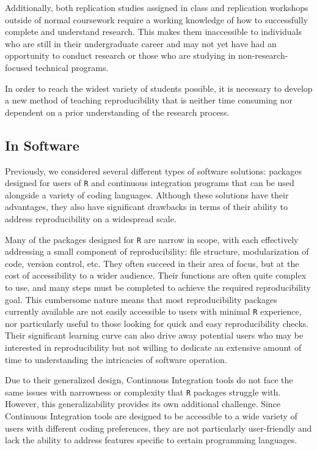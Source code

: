 \documentclass[12pt,twoside]{reedthesis}
\begin{document}
Additionally, both replication studies assigned in class and replication workshops outside of normal coursework require a working knowledge of how to successfully complete and understand research. This makes them inaccessible to individuals who are still in their undergraduate career and may not yet have had an opportunity to conduct research or those who are studying in non-research-focused technical programs.

In order to reach the widest variety of students possible, it is necessary to develop a new method of teaching reproducibility that is neither time consuming nor dependent on a prior understanding of the research process.

\hypertarget{in-software}{%
\subsection{In Software}\label{in-software}}

Previously, we considered several different types of software solutions: packages designed for users of \texttt{R} and continuous integration programs that can be used alongside a variety of coding languages. Although these solutions have their advantages, they also have significant drawbacks in terms of their ability to address reproducibility on a widespread scale.

Many of the packages designed for \texttt{R} are narrow in scope, with each effectively addressing a small component of reproducibility: file structure, modularization of code, version control, etc. They often succeed in their area of focus, but at the cost of accessibility to a wider audience. Their functions are often quite complex to use, and many steps must be completed to achieve the required reproducibility goal. This cumbersome nature means that most reproducibility packages currently available are not easily accessible to users with minimal \texttt{R} experience, nor particularly useful to those looking for quick and easy reproducibility checks. Their significant learning curve can also drive away potential users who may be interested in reproducibility but not willing to dedicate an extensive amount of time to understanding the intricacies of software operation.

Due to their generalized design, Continuous Integration tools do not face the same issues with narrowness or complexity that \texttt{R} packages struggle with. However, this generalizability provides its own additional challenge. Since Continuous Integration tools are designed to be accessible to a wide variety of users with different coding preferences, they are not particularly user-friendly and lack the ability to address features specific to certain programming languages.
\end{document}
